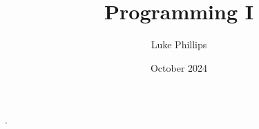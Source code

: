 \documentclass[10pt, a4paper]{article}
\title{Programming I}
\author{Luke Phillips}
\date{October 2024}
\begin{document}
\maketitle

\newpage

.
\end{document}

